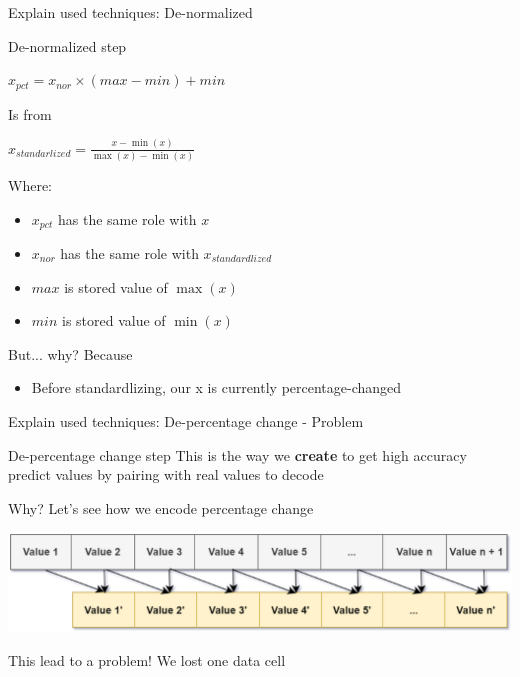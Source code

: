 \documentclass[compress, mathserif, fleqn, 10pt]{beamer}
\begin{document}
	\begin{frame}{Explain used techniques: De-normalized}
		\begin{block}{De-normalized step}
			\centerline{$x_{pct}=x_{nor}\times(max-min)+min \label{de-nor}$}
			\bigskip
			
			\centerline{Is from}
			
			\bigskip
			\centerline{$x_{standarlized}=\frac{x-\min (x)}{\max (x)-\min (x)}$}
			
			\smallskip
			Where:
			
			\begin{itemize}
				\item $x_{pct}$ has the same role with $x$
				\item $x_{nor}$ has the same role with $x_{standardlized}$
				\item $max$ is stored value of $\max(x)$
				\item $min$ is stored value of $\min(x)$
			\end{itemize}
		\end{block}
		
		\begin{exampleblock}{But... why?}
			Because
			\begin{itemize}
				\item Before standardlizing, our x is currently percentage-changed
			\end{itemize}
		\end{exampleblock}
	\end{frame}
	
	\begin{frame}{Explain used techniques: De-percentage change - Problem}
		\begin{block}{De-percentage change step}
			This is the way we \textbf{create} to get high accuracy predict values by pairing with real values to decode
			
			Why? Let's see how we encode percentage change
		\end{block}
		\smallskip
		\centerline{\includegraphics[width=\textwidth]{images/enc_percent.eps}}
		\bigskip
		\begin{exampleblock}{This lead to a problem!}
			We lost one data cell
		\end{exampleblock}
	\end{frame}
	
\end{document}
